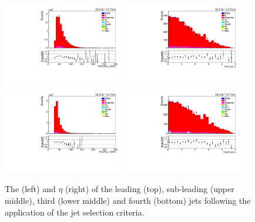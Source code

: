 \begin{figure}[h]
\\
\includegraphics[width=0.47\textwidth]{figs/background-estimation/plots/unblinded/ttbar_control/thirdJetPt_SingleTop_jetSel_emu.pdf}
\includegraphics[width=0.47\textwidth]{figs/background-estimation/plots/unblinded/ttbar_control/thirdJetEta_SingleTop_jetSel_emu.pdf}
\\
\includegraphics[width=0.47\textwidth]{figs/background-estimation/plots/unblinded/ttbar_control/fourthJetPt_SingleTop_jetSel_emu.pdf}
\includegraphics[width=0.47\textwidth]{figs/background-estimation/plots/unblinded/ttbar_control/fourthJetEta_SingleTop_jetSel_emu.pdf}
\caption{
The \pT (left) and $\eta$ (right) of the leading (top), sub-leading (upper middle), third (lower middle) and fourth (bottom) jets following the application of the jet selection criteria.
}
\label{fig:ttbar_jetsKinematics_jetCuts}
\end{figure}


